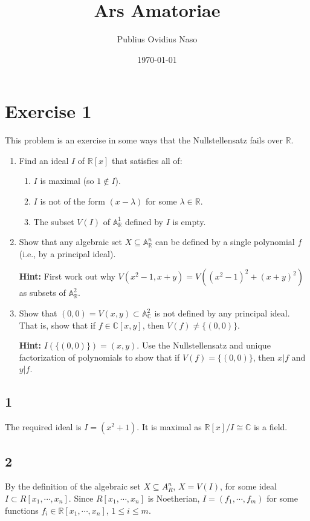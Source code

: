 \documentclass{article}
\title{Ars Amatoriae}
\author{Publius Ovidius Naso}
\date{\today}
\theoremstyle{definition}
\theoremstyle{definition}
\theoremstyle{remark}
\newcommand{\bb}[1]{\mathbb{#1}} %
\begin{document}
\section*{Exercise 1}
This problem is an exercise in some ways that the Nullstellensatz fails over $\mathbb{R}$.

\begin{enumerate}
    \item Find an ideal $I$ of $\mathbb{R}[x]$ that satisfies all of:
    \begin{enumerate}
        \item $I$ is maximal (so $1 \notin I$).
        \item $I$ is not of the form $(x - \lambda)$ for some $\lambda \in \mathbb{R}$.
        \item The subset $V(I)$ of $\mathbb{A}^1_{\mathbb{R}}$ defined by $I$ is empty.
    \end{enumerate}
    
    \item Show that any algebraic set $X \subseteq \mathbb{A}^n_{\mathbb{R}}$ can be defined by a single polynomial $f$ (i.e., by a principal ideal). 
    
    \textbf{Hint:} First work out why $V(x^2 - 1, x + y) = V((x^2 - 1)^2 + (x + y)^2)$ as subsets of $\mathbb{A}^2_{\mathbb{R}}$.
    
    \item Show that $(0,0) = V(x,y) \subset \mathbb{A}^2_{\mathbb{C}}$ is not defined by any principal ideal. That is, show that if $f \in \mathbb{C}[x,y]$, then $V(f) \neq \{(0,0)\}$. 
    
    \textbf{Hint:} $I(\{(0,0)\}) = (x, y)$. Use the Nullstellensatz and unique factorization of polynomials to show that if $V(f) = \{(0,0)\}$, then $x | f$ and $y | f$.
\end{enumerate}

\subsection*{1}

The required ideal is $I = (x^2 + 1)$.
It is maximal as $\bb{R}[x] / I \cong \bb{C}$ is a field. 

\subsection*{2}

By the definition of the algebraic set $X \subseteq A_R^n$, $X = V(I)$, for some ideal $I \subset R[x_1, \cdots, x_n]$. Since $R[x_1, \cdots, x_n]$ is Noetherian, $I = (f_1, \cdots, f_m)$ for some functions $f_i \in \bb{R}[x_1, \cdots, x_n]$, $1 \leq i \leq m$.
\end{document}
